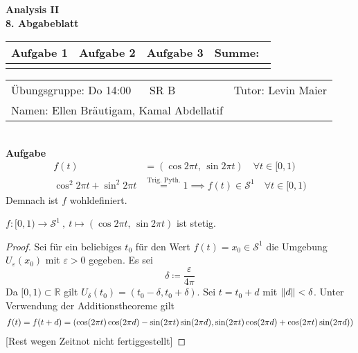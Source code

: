 \documentclass[a4paper, 12pt]{scrartcl}
\newcounter{taski}
\newcommand{\task}{\stepcounter{taski}\textbf{Aufgabe \arabic{taski}}~}
\begin{document}
\begin{center}
    \textbf{Analysis II\\8. Abgabeblatt}\\[2em]
	\def\arraystretch{2}
    \begin{tabular}{|l|l|l||p{18mm}|}
        \hline
         Aufgabe 1 & Aufgabe 2 & Aufgabe 3 & Summe:~ \\
         \hline &&&\\
         \hline  
    \end{tabular}
\end{center}
\begingroup
\def\arraystretch{1.5}
\begin{tabular}{p{}p{}}
	\hline
    Übungsgruppe: Do 14:00 ~~ SR B& Tutor: Levin Maier \\
    Namen: Ellen Bräutigam, Kamal Abdellatif &\\
    \hline
\end{tabular}
\endgroup\\

\setcounter{taski}{2}
\task
\begin{align*}
    f(t) &= (\cos 2\pi t,\,\sin 2\pi t) \quad \forall t \in [0,1) \\
    \cos^2 2\pi t + \sin^2 2\pi t &\overset{\text{Trig. Pyth.}}= 1 \implies f(t) \in \mathcal{S}^1 \quad \forall t \in [0,1)
\end{align*}
Demnach ist $f$ wohldefiniert.
\begin{theorem}
    $f: [0,1) \rightarrow \mathcal{S}^1 ~,~ t \mapsto (\cos 2\pi t,\,\sin 2\pi t)$ ist stetig.
\end{theorem}
\begin{proof}
    Sei für ein beliebiges $t_0$ für den Wert $f(t) = x_0 \in \mathcal{S}^1$ die Umgebung $U_\varepsilon(x_0)$ mit $\varepsilon > 0$ gegeben. Es sei
\[ \delta \coloneqq \frac{\varepsilon}{4\pi}  \]
Da $[0,1) \subset \mathbb{R}$ gilt $U_\delta(t_0) = (t_0-\delta,t_0+\delta)$. Sei $t = t_0 + d$ mit $\norm{d} < \delta$. Unter Verwendung der Additionstheoreme gilt 
\begin{align*}
    f(t) &= f(t+d) = \qty(\cos(2\pi t)\cos(2\pi d) - \sin(2\pi t)\sin(2\pi d), \sin(2\pi t)\cos(2\pi d) + \cos(2\pi t)\sin(2\pi d)) \\
\end{align*}
[Rest wegen Zeitnot nicht fertiggestellt]
\end{proof}
\end{document}
